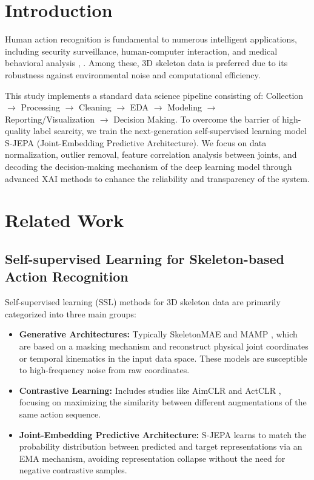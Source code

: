 \documentclass[conference]{IEEEtran}
\begin{document}
\section{Introduction}
Human action recognition is fundamental to numerous intelligent applications, including security surveillance, human-computer interaction, and medical behavioral analysis \cite{b1}, \cite{b11}. Among these, 3D skeleton data is preferred due to its robustness against environmental noise and computational efficiency.

This study implements a standard data science pipeline consisting of: Collection $\rightarrow$ Processing $\rightarrow$ Cleaning $\rightarrow$ EDA $\rightarrow$ Modeling $\rightarrow$ Reporting/Visualization $\rightarrow$ Decision Making. To overcome the barrier of high-quality label scarcity, we train the next-generation self-supervised learning model S-JEPA (Joint-Embedding Predictive Architecture). We focus on data normalization, outlier removal, feature correlation analysis between joints, and decoding the decision-making mechanism of the deep learning model through advanced XAI methods to enhance the reliability and transparency of the system.

\section{Related Work}
\subsection{Self-supervised Learning for Skeleton-based Action Recognition}
Self-supervised learning (SSL) methods for 3D skeleton data are primarily categorized into three main groups:
\begin{itemize}
    \item \textbf{Generative Architectures:} Typically SkeletonMAE \cite{b4} and MAMP \cite{b3}, which are based on a masking mechanism and reconstruct physical joint coordinates or temporal kinematics in the input data space. These models are susceptible to high-frequency noise from raw coordinates.
    \item \textbf{Contrastive Learning:} Includes studies like AimCLR \cite{b5} and ActCLR \cite{b6}, focusing on maximizing the similarity between different augmentations of the same action sequence.
    \item \textbf{Joint-Embedding Predictive Architecture:} S-JEPA \cite{b7} learns to match the probability distribution between predicted and target representations via an EMA mechanism, avoiding representation collapse without the need for negative contrastive samples.
\end{itemize}
\end{document}
